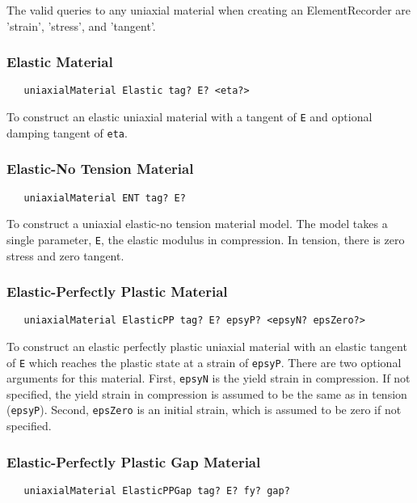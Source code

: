\documentclass[12pt]{article}
\begin{document}
The valid queries to any uniaxial material when creating an ElementRecorder
are 'strain', 'stress', and 'tangent'.

\subsubsection{Elastic Material}
{\sf\small
\begin{verbatim}
   uniaxialMaterial Elastic tag? E? <eta?>
\end{verbatim}
}

\noindent To construct an elastic uniaxial material with a tangent of {\tt E}
and optional damping tangent of {\tt eta}.

\subsubsection{Elastic-No Tension Material}
{\sf\small
\begin{verbatim}
   uniaxialMaterial ENT tag? E?
\end{verbatim}
}

\noindent To construct a uniaxial elastic-no tension material model.
The model takes a single parameter, {\tt E}, the elastic modulus in
compression.
In tension, there is zero stress and zero tangent.

\subsubsection{Elastic-Perfectly Plastic Material}
{\sf\small
\begin{verbatim}
   uniaxialMaterial ElasticPP tag? E? epsyP? <epsyN? epsZero?>
\end{verbatim}
}

\noindent To construct an elastic perfectly plastic uniaxial material
with an elastic tangent of {\tt E} which
reaches the plastic state at a strain of {\tt epsyP}. There are two optional
arguments for this material. First, {\tt epsyN} is the yield strain in
compression.
If not specified, the yield strain in compression is assumed to be the same
as in tension ({\tt epsyP}). Second, {\tt epsZero} is an initial strain,
which is assumed to
be zero if not specified.

\subsubsection{Elastic-Perfectly Plastic Gap Material}
{\sf\small
\begin{verbatim}
   uniaxialMaterial ElasticPPGap tag? E? fy? gap?
\end{verbatim}
}
\end{document}
